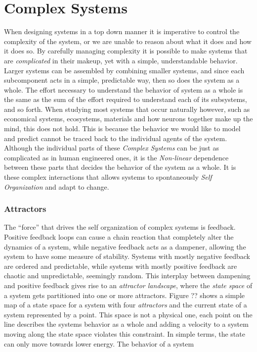 \section{Complex Systems}
When designing systems in a top down manner it is imperative to control the
complexity of the system, or we are unable to reason about what it does and how
it does so.
By carefully managing complexity it is possible to make systems that are
\emph{complicated} in their makeup, yet with a simple, understandable behavior.
Larger systems can be assembled by combining smaller systems, and since each
subcomponent acts in a simple, predictable way, then so does the system as a
whole.
The effort necessary to understand the behavior of system as a whole is the same
as the sum of the effort required to understand each of its subsystems, and so
forth.
%
When studying most systems that occur naturally however, such as economical
systems, ecosystems, materials and how neurons together make up the mind, this
does not hold.
%
This is because the behavior we would like to model and predict cannot be traced
back to the individual agents of the system.
%
Although the individual parts of these \emph{Complex Systems} can be just as
complicated as in human engineered ones, it is the \emph{Non-linear} dependence
between these parts that decides the behavior of the system as a whole.
%
It is these complex interactions that allows systems to spontaneously \emph{Self
  Organization} and adapt to change.
%
\subsubsection{Attractors}
The ``force'' that drives the self organization of complex systems is feedback.
Positive feedback loops can cause a chain reaction that completely alter the
dynamics of a system, while negative feedback acts as a dampener, allowing the
system to have some measure of stability.
Systems with mostly negative feedback are ordered and predictable, while systems
with mostly positive feedback are chaotic and unpredictable, seemingly random.
This interplay between dampening and positive feedback gives rise to an
%
\emph{attractor landscape}, where the \emph{state space} of a system gets
partitioned into one or more attractors.
%
Figure ?? shows a simple map of a state space for a system with four
\emph{attractors} and the current state of a system represented by a point.
This space is not a physical one, each point on the line describes the systems
behavior as a whole and adding a velocity to a system moving along the state
space violates this constraint.
In simple terms, the state can only move towards lower energy.
%
The behavior of a system 
%

